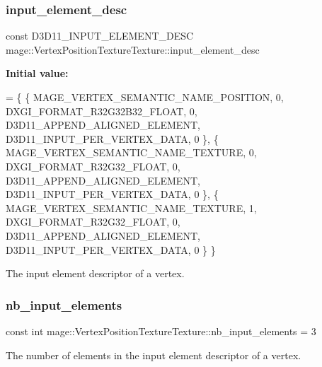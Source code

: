 \subsubsection{\texorpdfstring{input\+\_\+element\+\_\+desc}{input\_element\_desc}}
{\footnotesize\ttfamily const D3\+D11\+\_\+\+I\+N\+P\+U\+T\+\_\+\+E\+L\+E\+M\+E\+N\+T\+\_\+\+D\+E\+SC mage\+::\+Vertex\+Position\+Texture\+Texture\+::input\+\_\+element\+\_\+desc\hspace{0.3cm}{\ttfamily [static]}}

{\bfseries Initial value\+:}
\begin{DoxyCode}
= \{
        \{ MAGE\_VERTEX\_SEMANTIC\_NAME\_POSITION, 0, DXGI\_FORMAT\_R32G32B32\_FLOAT,    0, 
      D3D11\_APPEND\_ALIGNED\_ELEMENT, D3D11\_INPUT\_PER\_VERTEX\_DATA, 0 \},
        \{ MAGE\_VERTEX\_SEMANTIC\_NAME\_TEXTURE,  0, DXGI\_FORMAT\_R32G32\_FLOAT,       0, 
      D3D11\_APPEND\_ALIGNED\_ELEMENT, D3D11\_INPUT\_PER\_VERTEX\_DATA, 0 \},
        \{ MAGE\_VERTEX\_SEMANTIC\_NAME\_TEXTURE,  1, DXGI\_FORMAT\_R32G32\_FLOAT,       0, 
      D3D11\_APPEND\_ALIGNED\_ELEMENT, D3D11\_INPUT\_PER\_VERTEX\_DATA, 0 \}
    \}
\end{DoxyCode}
The input element descriptor of a vertex. \hypertarget{structmage_1_1_vertex_position_texture_texture_ac15391bbc084b6843ba3b9696b7f502a}{}\label{structmage_1_1_vertex_position_texture_texture_ac15391bbc084b6843ba3b9696b7f502a} 
\subsubsection{\texorpdfstring{nb\+\_\+input\+\_\+elements}{nb\_input\_elements}}
{\footnotesize\ttfamily const int mage\+::\+Vertex\+Position\+Texture\+Texture\+::nb\+\_\+input\+\_\+elements = 3\hspace{0.3cm}{\ttfamily [static]}}

The number of elements in the input element descriptor of a vertex. \hypertarget{structmage_1_1_vertex_position_texture_texture_aed106149eda65a20e60ebc3b93535270}{}\label{structmage_1_1_vertex_position_texture_texture_aed106149eda65a20e60ebc3b93535270} 
